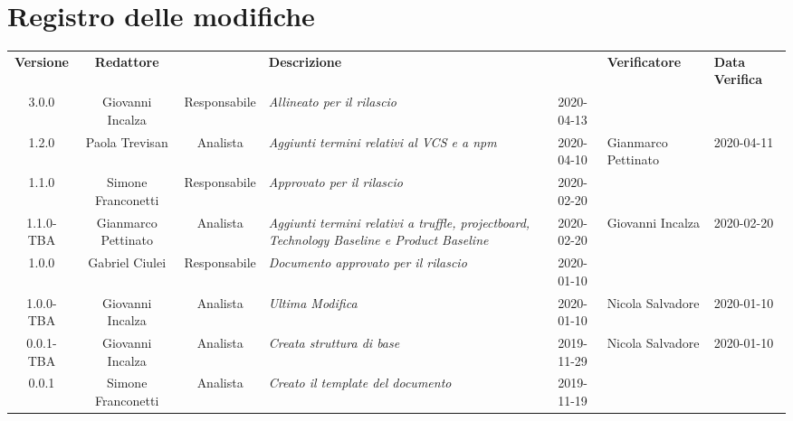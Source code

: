 \section*{Registro delle modifiche}
\renewcommand{\arraystretch}{1.8}

  \begin{longtable}{|c|c|c|p{3.8cm}|c|}
    \hline

    \textbf{Versione} & \textbf{Redattore} &  & \textbf{Descrizione} &       & \textbf{Verificatore} & \textbf{Data Verifica} \\
    3.0.0 & Giovanni Incalza & Responsabile & \small{\textit{Allineato per il rilascio}} & 2020-04-13 & & \\
    1.2.0 & Paola Trevisan & Analista & \small{\textit{Aggiunti termini relativi al VCS e a npm}} & 2020-04-10 & Gianmarco Pettinato & 2020-04-11 \\
    1.1.0 & Simone Franconetti & Responsabile & \small{\textit{Approvato per il rilascio}} & 2020-02-20 & & \\
    1.1.0-TBA & Gianmarco Pettinato & Analista & \small{\textit{Aggiunti termini relativi a truffle, projectboard, Technology Baseline e Product Baseline}} & 2020-02-20 & Giovanni Incalza & 2020-02-20\\
    1.0.0 & Gabriel Ciulei & Responsabile & \small{\textit{ Documento approvato per il rilascio }} & 2020-01-10 & &\\
    1.0.0-TBA & Giovanni Incalza & Analista & \small{\textit{ Ultima Modifica }} & 2020-01-10 & Nicola Salvadore & 2020-01-10\\
    0.0.1-TBA & Giovanni Incalza & Analista & \small{\textit{ Creata struttura di base }} & 2019-11-29 & Nicola Salvadore & 2020-01-10 \\
    \hline

    0.0.1 & Simone Franconetti & Analista & \small{\textit{Creato il template del documento}} & 2019-11-19\\

    \hline
  \end{longtable}

